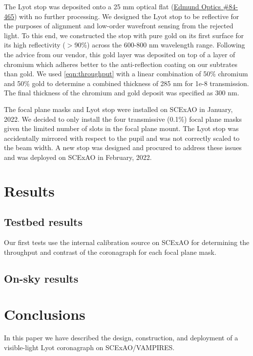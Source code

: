 \documentclass[12pt]{spieman}  %
\begin{document}
\begin{spacing}{2}
The Lyot stop was deposited onto a 25 mm optical flat (\href{https://www.edmundoptics.com/p/25mm-dia-3mm-thick-nir-i-coated-lambda10-fused-silica-window/27561/}{Edmund Optics \#84-465}) with no further processing. We designed the Lyot stop to be reflective for the purposes of alignment and low-order wavefront sensing from the rejected light. To this end, we constructed the stop with pure gold on its first surface for its high reflectivity ($>$90\%) across the 600-800 nm wavelength range. Following the advice from our vendor, this gold layer was deposited on top of a layer of chromium which adheres better to the anti-reflection coating on our subtrates than gold. We used \autoref{eqn:throughput} with a linear combination of 50\% chromium and 50\% gold to determine a combined thickness of 285 nm for 1e-8 transmission. The final thickness of the chromium and gold deposit was specified as 300 nm.

The focal plane masks and Lyot stop were installed on SCExAO in January, 2022. We decided to only install the four  transmissive (0.1\%) focal plane masks given the limited number of slots in the focal plane mount. The Lyot stop was accidentally mirrored with respect to the pupil and was not correctly scaled to the beam width. A new stop was designed and procured to address these issues and was deployed on SCExAO in February, 2022.

\section{Results}\label{sec:results}

\subsection{Testbed results}\label{sec:testbed}

Our first tests use the internal calibration source on SCExAO for determining the throughput and contrast of the coronagraph for each focal plane mask. 

\subsection{On-sky results}\label{sec:onsky}

\section{Conclusions}\label{sec:conclusions}

In this paper we have described the design, construction, and deployment of a visible-light Lyot coronagraph on SCExAO/VAMPIRES.


\end{spacing}
\end{document}

